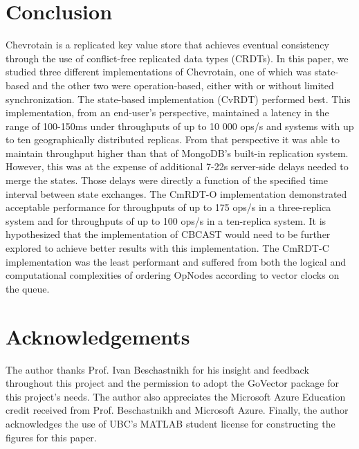 \documentclass[sigconf,nonacm,10pt]{acmart}
\begin{document}
\section{Conclusion}
Chevrotain is a replicated key value store that achieves eventual consistency through the use of conflict-free replicated data types (CRDTs). In this paper, we studied three different implementations of Chevrotain, one of which was state-based and the other two were operation-based, either with or without limited synchronization. The state-based implementation (CvRDT) performed best. This implementation, from an end-user's perspective, maintained a latency in the range of 100-150ms under throughputs of up to 10 000 ops/s and systems with up to ten geographically distributed replicas. From that perspective it was able to maintain throughput higher than that of MongoDB's built-in replication system. However, this was at the expense of additional 7-22s server-side delays needed to merge the states. Those delays were directly a function of the specified time interval between state exchanges. The CmRDT-O implementation demonstrated acceptable performance for throughputs of up to 175 ops/s in a three-replica system and for throughputs of up to 100 ops/s in a ten-replica system. It is hypothesized that the implementation of CBCAST would need to be further explored to achieve better results with this implementation. The CmRDT-C implementation was the least performant and suffered from both the logical and computational complexities of ordering OpNodes according to vector clocks on the queue. 

\section*{Acknowledgements}
The author thanks Prof. Ivan Beschastnikh for his insight and feedback throughout this project and the permission to adopt the GoVector package for this project's needs. The author also appreciates the Microsoft Azure Education credit received from Prof. Beschastnikh and Microsoft Azure. Finally, the author acknowledges the use of UBC's MATLAB student license for constructing the figures for this paper.



\end{document}
